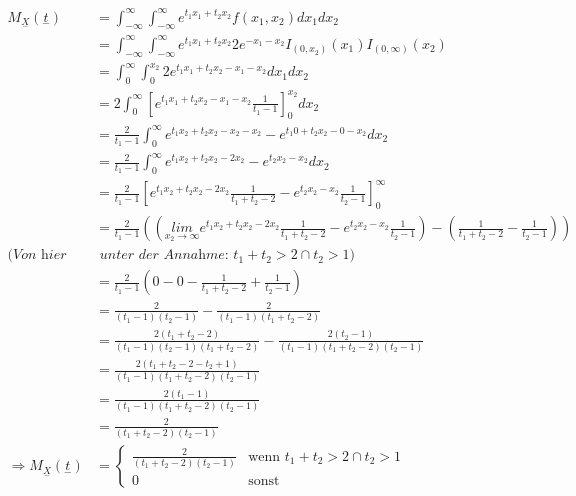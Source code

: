 \documentclass{article}
\begin{document}
\begin{align*}
    M_{\underset{-}{X}}(\underset{-}{t}) &= \int_{-\infty}^{\infty}\int_{-\infty}^{\infty} e^{t_1x_1 + t_2x_2} f(x_1, x_2) dx_1 dx_2 \\
    &= \int_{-\infty}^{\infty}\int_{-\infty}^{\infty} e^{t_1x_1 + t_2x_2} 2 e^{-x_1 - x_2} I_{(0, x_2)}(x_1) I_{(0, \infty)}(x_2) \\
    &= \int_{0}^{\infty}\int_{0}^{x_2} 2 e^{t_1 x_1 + t_2 x_2 -x_1 - x_2} dx_1 dx_2 \\
    &= 2 \int_{0}^{\infty} \left[e^{t_1 x_1 + t_2 x_2 -x_1 - x_2}\frac{1}{t_1 - 1}\right]_0^{x_2} dx_2 \\
    &= \frac{2}{t_1 - 1} \int_{0}^{\infty}  e^{t_1 x_2 + t_2 x_2 -x_2 - x_2} - e^{t_1 0 + t_2 x_2 -0 - x_2}  dx_2 \\
    &= \frac{2}{t_1 - 1} \int_{0}^{\infty}  e^{t_1 x_2 + t_2 x_2 - 2x_2 } - e^{t_2 x_2 - x_2} dx_2 \\
    &= \frac{2}{t_1 - 1} \left[e^{t_1 x_2 + t_2 x_2 - 2x_2 }\frac{1}{t_1 + t_2 - 2} - e^{t_2 x_2 - x_2}\frac{1}{t_2 -1}\right]^{\infty}_0 \\
    &= \frac{2}{t_1 - 1} ((\underset{x_2 \rightarrow \infty}{lim}e^{t_1 x_2 + t_2 x_2 - 2x_2 }\frac{1}{t_1 + t_2 - 2} - e^{t_2 x_2 - x_2}\frac{1}{t_2 -1}) - (\frac{1}{t_1 + t_2 - 2} -\frac{1}{t_2 -1})) \\
    (\textit{Von hier nur} &\textit{ unter der Annahme: } t_1 + t_2 > 2 \cap t_2 > 1) \\
    &= \frac{2}{t_1-1} (0- 0- \frac{1}{t_1 + t_2 - 2} + \frac{1}{t_2 -1})\\
    &= \frac{2}{(t_1-1) (t_2 -1 )} -\frac{2}{(t_1 -1)(t_1 + t_2 -2)} \\
    &= \frac{2 (t_1 + t_2 -2)}{(t_1-1) (t_2 -1 )(t_1 + t_2 -2)} -\frac{2(t_2 -1 )}{(t_1 -1)(t_1 + t_2 -2)(t_2 -1 )} \\
    &= \frac{2(t_1+ t_2 -2 - t_2 + 1)}{(t_1 -1)(t_1 + t_2 -2)(t_2 -1 )} \\
    &= \frac{2(t_1 -1)}{(t_1 -1)(t_1 + t_2 -2)(t_2 -1 )} \\
    &= \frac{2}{(t_1 + t_2 -2)(t_2 -1 )} \\
    \Longrightarrow M_{\underset{-}{X}}(\underset{-}{t}) &= \begin{cases}
        \frac{2}{(t_1 + t_2 -2)(t_2 -1 )} &\text{wenn } t_1 + t_2 > 2 \cap t_2 > 1 \\
        0 &\text{sonst}
    \end{cases}
\end{align*} 
\end{document}
